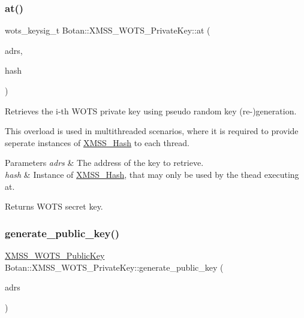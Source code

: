 \subsubsection{\texorpdfstring{at()}{at()}\hspace{0.1cm}{\footnotesize\ttfamily [2/2]}}
{\footnotesize\ttfamily wots\+\_\+keysig\+\_\+t Botan\+::\+X\+M\+S\+S\+\_\+\+W\+O\+T\+S\+\_\+\+Private\+Key\+::at (\begin{DoxyParamCaption}\item[{const \hyperlink{class_botan_1_1_x_m_s_s___address}{X\+M\+S\+S\+\_\+\+Address} \&}]{adrs,  }\item[{\hyperlink{class_botan_1_1_x_m_s_s___hash}{X\+M\+S\+S\+\_\+\+Hash} \&}]{hash }\end{DoxyParamCaption})\hspace{0.3cm}{\ttfamily [inline]}}

Retrieves the i-\/th W\+O\+TS private key using pseudo random key (re-\/)generation.

This overload is used in multithreaded scenarios, where it is required to provide seperate instances of \hyperlink{class_botan_1_1_x_m_s_s___hash}{X\+M\+S\+S\+\_\+\+Hash} to each thread.


\begin{DoxyParams}{Parameters}
{\em adrs} & The address of the key to retrieve. \\
\hline
{\em hash} & Instance of \hyperlink{class_botan_1_1_x_m_s_s___hash}{X\+M\+S\+S\+\_\+\+Hash}, that may only be used by the thead executing at.\\
\hline
\end{DoxyParams}
\begin{DoxyReturn}{Returns}
W\+O\+TS secret key. 
\end{DoxyReturn}
\mbox{\label{class_botan_1_1_x_m_s_s___w_o_t_s___private_key_a6557ddafc4e18ce4750c8a69b843481d}} 
\subsubsection{\texorpdfstring{generate\+\_\+public\+\_\+key()}{generate\_public\_key()}\hspace{0.1cm}{\footnotesize\ttfamily [1/3]}}
{\footnotesize\ttfamily \hyperlink{class_botan_1_1_x_m_s_s___w_o_t_s___public_key}{X\+M\+S\+S\+\_\+\+W\+O\+T\+S\+\_\+\+Public\+Key} Botan\+::\+X\+M\+S\+S\+\_\+\+W\+O\+T\+S\+\_\+\+Private\+Key\+::generate\+\_\+public\+\_\+key (\begin{DoxyParamCaption}\item[{\hyperlink{class_botan_1_1_x_m_s_s___address}{X\+M\+S\+S\+\_\+\+Address} \&}]{adrs }\end{DoxyParamCaption})}


